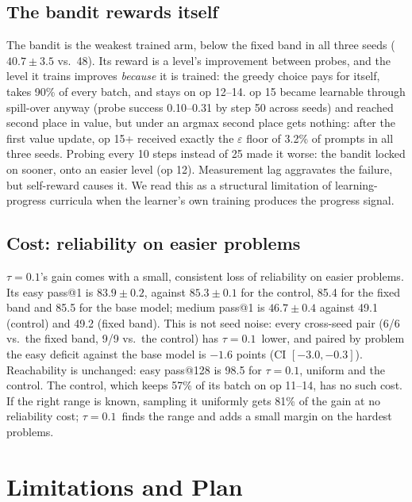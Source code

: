 \documentclass[11pt]{article}
\newcommand{\tauone}{$\tau{=}0.1$}
\begin{document}
\subsection{The bandit rewards itself}
\label{sec:bandit}

The bandit is the weakest trained arm, below the fixed band in all three seeds ($40.7\pm3.5$ vs.\ 48). Its
reward is a level's improvement between probes, and the level it trains improves \emph{because} it is trained:
the greedy choice pays for itself, takes 90\% of every batch, and stays on op 12--14. op 15 became learnable
through spill-over anyway (probe success 0.10--0.31 by step 50 across seeds) and reached second place in
value, but under an argmax second place gets nothing: after the first value update, op 15+ received exactly
the $\varepsilon$ floor of 3.2\% of prompts in all three seeds. Probing every 10 steps instead of 25 made it
worse: the bandit locked on sooner, onto an easier level (op 12). Measurement lag aggravates the failure, but
self-reward causes it. We read this as a structural limitation of learning-progress curricula
\citep{graves2017automated,matiisen2019teacher} when the learner's own training produces the progress signal.

\subsection{Cost: reliability on easier problems}

\tauone's gain comes with a small, consistent loss of reliability on easier problems. Its easy pass@1 is
$83.9\pm0.2$, against $85.3\pm0.1$ for the control, 85.4 for the fixed band and 85.5 for the base model;
medium pass@1 is $46.7\pm0.4$ against 49.1 (control) and 49.2 (fixed band). This is not seed noise: every
cross-seed pair (6/6 vs.\ the fixed band, 9/9 vs.\ the control) has \tauone\ lower, and paired by problem the
easy deficit against the base model is $-1.6$ points (CI $[-3.0,-0.3]$). Reachability is unchanged: easy
pass@128 is 98.5 for \tauone, uniform and the control. The control, which keeps 57\% of its batch on op
11--14, has no such cost. If the right range is known, sampling it uniformly gets 81\% of the gain at no
reliability cost; \tauone\ finds the range and adds a small margin on the hardest problems.

\section{Limitations and Plan}
\label{sec:plan}
\end{document}
